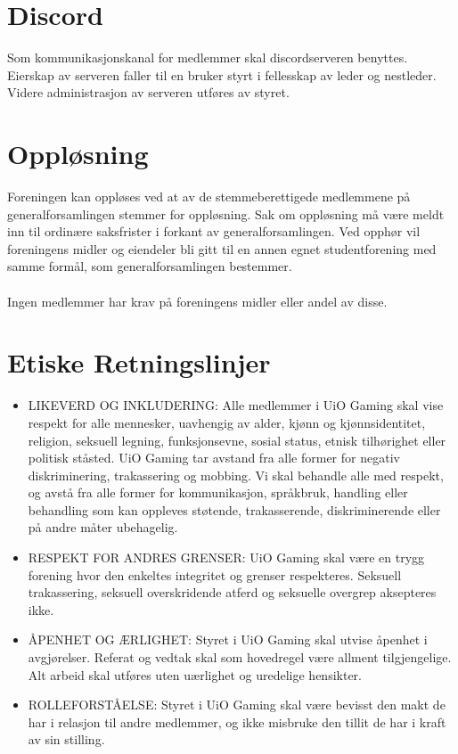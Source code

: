 \documentclass[12pt,a4paper,norsk]{article}
\begin{document}
\section{Discord}

Som kommunikasjonskanal for medlemmer skal discordserveren  benyttes. Eierskap av serveren faller til en bruker styrt i fellesskap av leder og nestleder. Videre administrasjon av serveren utføres av styret.



\section{Oppløsning}

Foreningen kan oppløses ved at  av de stemmeberettigede medlemmene på generalforsamlingen stemmer for oppløsning. Sak om oppløsning må være meldt inn til ordinære saksfrister i forkant av generalforsamlingen. Ved opphør vil foreningens midler og eiendeler bli gitt til en annen egnet studentforening med samme formål, som generalforsamlingen bestemmer.
\\
\\
Ingen medlemmer har krav på foreningens midler eller andel av disse.



\section{Etiske Retningslinjer}

\begin{itemize}
    \item LIKEVERD OG INKLUDERING:  
        Alle medlemmer i UiO Gaming skal vise respekt for alle mennesker, uavhengig av alder, kjønn og kjønnsidentitet, religion, seksuell legning, funksjonsevne, sosial status, etnisk tilhørighet eller politisk ståsted. UiO Gaming tar avstand fra alle former for negativ diskriminering, trakassering og mobbing. Vi skal behandle alle med respekt, og avstå fra alle former for kommunikasjon, språkbruk, handling eller behandling som kan oppleves støtende, trakasserende, diskriminerende eller på andre måter ubehagelig.
    
    \item RESPEKT FOR ANDRES GRENSER: 
        UiO Gaming skal være en trygg forening hvor den enkeltes integritet og grenser respekteres. Seksuell trakassering, seksuell overskridende atferd og seksuelle overgrep aksepteres ikke.
     
    \item ÅPENHET OG ÆRLIGHET: 
    Styret i UiO Gaming skal utvise åpenhet i avgjørelser. Referat og vedtak skal som hovedregel være allment tilgjengelige. Alt arbeid skal utføres uten uærlighet og uredelige hensikter.
     
    \item ROLLEFORSTÅELSE: 
    Styret i UiO Gaming skal være bevisst den makt de har i relasjon til andre medlemmer, og ikke misbruke den tillit de har i kraft av sin stilling.
    \end{itemize}
\end{document}
